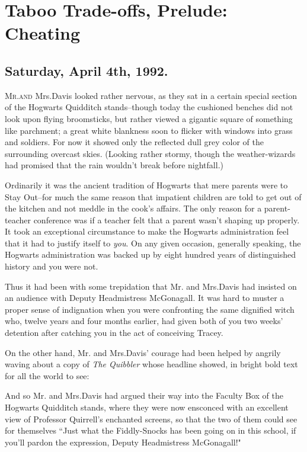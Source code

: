 \chapter{Taboo Trade-offs, Prelude: Cheating}

\section{Saturday, April 4th, 1992.}

\lettrine{M}{r.\?and} Mrs.\?Davis looked rather nervous, as they sat in a certain special section of the Hogwarts Quidditch stands\---though today the cushioned benches did not look upon flying broomsticks, but rather viewed a gigantic square of something like parchment; a great white blankness soon to flicker with windows into grass and soldiers. For now it showed only the reflected dull grey color of the surrounding overcast skies. (Looking rather stormy, though the weather-wizards had promised that the rain wouldn't break before nightfall.)

Ordinarily it was the ancient tradition of Hogwarts that mere parents were to Stay Out\---for much the same reason that impatient children are told to get out of the kitchen and not meddle in the cook's affairs. The only reason for a parent-teacher conference was if a teacher felt that a parent wasn't shaping up properly. It took an exceptional circumstance to make the Hogwarts administration feel that it had to justify itself to \emph{you}. On any given occasion, generally speaking, the Hogwarts administration was backed up by eight hundred years of distinguished history and you were not.

Thus it had been with some trepidation that Mr. and Mrs.\?Davis had insisted on an audience with Deputy Headmistress McGonagall. It was hard to muster a proper sense of indignation when you were confronting the same dignified witch who, twelve years and four months earlier, had given both of you two weeks' detention after catching you in the act of conceiving Tracey.

On the other hand, Mr. and Mrs.\?Davis' courage had been helped by angrily waving about a copy of \emph{The Quibbler} whose headline showed, in bright bold text for all the world to see:


And so Mr. and Mrs.\?Davis had argued their way into the Faculty Box of the Hogwarts Quidditch stands, where they were now ensconced with an excellent view of Professor Quirrell's enchanted screens, so that the two of them could see for themselves ``Just what the Fiddly-Snocks has been going on in this school, if you'll pardon the expression, Deputy Headmistress McGonagall!"

